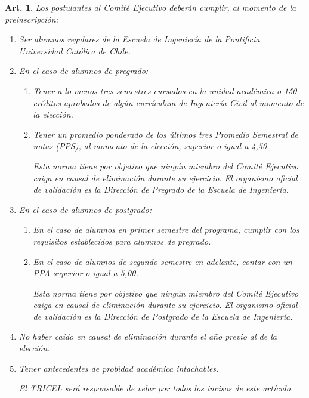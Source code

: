 \documentclass[letterpaper,11pt]{article}
\theoremstyle{plain}
\newtheorem{art}{Art.} %
\begin{document}
		\begin{art}\label{requisitosEjecutivo}
			Los postulantes al Comité Ejecutivo deberán cumplir, al momento de la preinscripción:
			\begin{enumerate}
				\item Ser alumnos regulares de la Escuela de Ingeniería de la Pontificia Universidad Católica de Chile.
				\item En el caso de alumnos de pregrado:
					\begin{enumerate}
						\item Tener a lo menos tres semestres cursados en la unidad académica o 150 créditos aprobados de algún currículum de Ingeniería Civil al momento de la elección.
						
						\item Tener un promedio ponderado de los últimos tres Promedio Semestral de notas (PPS), al momento de la elección, superior o igual a 4,50.

						Esta norma tiene por objetivo que ningún miembro del Comité Ejecutivo caiga en causal de eliminación durante su ejercicio. El organismo oficial de validación es la Dirección de Pregrado de la Escuela de Ingeniería.
					\end{enumerate}
				\item En el caso de alumnos de postgrado:
					\begin{enumerate}
						\item En el caso de alumnos en primer semestre del programa, cumplir con los requisitos establecidos para alumnos de pregrado.
						\item En el caso de alumnos de segundo semestre en adelante, contar con un PPA superior o igual a 5,00.

						Esta norma tiene por objetivo que ningún miembro del Comité Ejecutivo caiga en causal de eliminación durante su ejercicio. El organismo oficial de validación es la Dirección de Postgrado de la Escuela de Ingeniería.
					\end{enumerate}

				\item No haber caído en causal de eliminación durante el año previo al de la elección.
				
				\item Tener antecedentes de probidad académica intachables. 

				El TRICEL será responsable de velar por todos los incisos de este artículo.
			\end{enumerate}
		\end{art}
\end{document}
